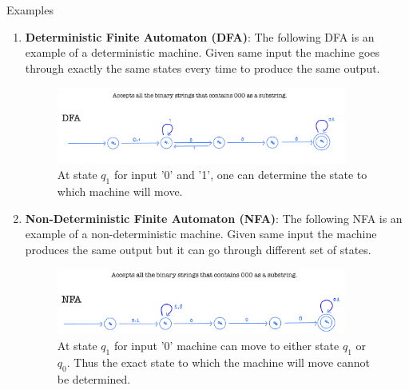 \documentclass[11pt,notheorems,hyperref={pdfauthor=whatever}]{beamer}
\begin{document}
\begin{frame}[allowframebreaks]{Examples}
\bigskip
\begin{enumerate}
    \item \alert{\textbf{Deterministic Finite Automaton (DFA)}}: The following DFA is an example of a deterministic machine. Given same input the machine goes through exactly the same states every time to produce the same output.
    \bigskip
    \begin{figure}
    \centering
    \includegraphics[width=0.9\textwidth]{figures/exp1_1.png}
    \caption{At state $q_1$ for input '0' and '1', one can determine the state to which machine will move.}
    \label{fig:DFA}
    \end{figure}
    \bigskip
    \item \alert{\textbf{Non-Deterministic Finite Automaton (NFA)}}: The following NFA is an example of a non-deterministic machine. Given same input the machine produces the same output but it can go through different set of states.
    \bigskip
    \begin{figure}
    \centering
    \includegraphics[width=0.9\textwidth]{figures/exp1_2.png}
    \caption{At state $q_1$ for input '0' machine can move to either state $q_1$ or $q_0$. Thus the exact state to which the machine will move cannot be determined.}
    \label{fig:NFA}
    \end{figure}
\end{enumerate}
\end{frame}

\end{document}
